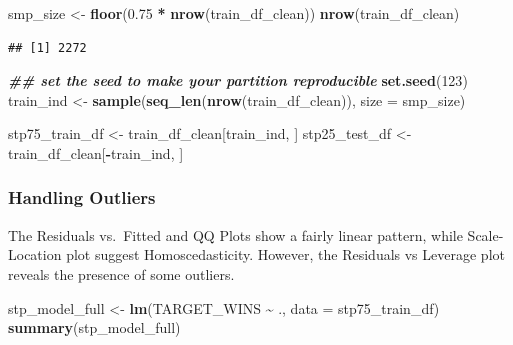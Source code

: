 \documentclass[
]{article}
\newenvironment{Shaded}{\begin{snugshade}}{\end{snugshade}}
\newcommand{\AttributeTok}[1]{\textcolor[rgb]{0.13,0.29,0.53}{#1}}
\newcommand{\DecValTok}[1]{\textcolor[rgb]{0.00,0.00,0.81}{#1}}
\newcommand{\DocumentationTok}[1]{\textcolor[rgb]{0.56,0.35,0.01}{\textbf{\textit{#1}}}}
\newcommand{\FloatTok}[1]{\textcolor[rgb]{0.00,0.00,0.81}{#1}}
\newcommand{\FunctionTok}[1]{\textcolor[rgb]{0.13,0.29,0.53}{\textbf{#1}}}
\newcommand{\NormalTok}[1]{#1}
\newcommand{\OtherTok}[1]{\textcolor[rgb]{0.56,0.35,0.01}{#1}}
\newcommand{\SpecialCharTok}[1]{\textcolor[rgb]{0.81,0.36,0.00}{\textbf{#1}}}
\begin{document}
\begin{Shaded}
\begin{Highlighting}[]
\NormalTok{smp\_size }\OtherTok{\textless{}{-}} \FunctionTok{floor}\NormalTok{(}\FloatTok{0.75} \SpecialCharTok{*} \FunctionTok{nrow}\NormalTok{(train\_df\_clean))}
 \FunctionTok{nrow}\NormalTok{(train\_df\_clean)}
\end{Highlighting}
\end{Shaded}

\begin{verbatim}
## [1] 2272
\end{verbatim}

\begin{Shaded}
\begin{Highlighting}[]
\DocumentationTok{\#\# set the seed to make your partition reproducible}
\FunctionTok{set.seed}\NormalTok{(}\DecValTok{123}\NormalTok{)}
\NormalTok{train\_ind }\OtherTok{\textless{}{-}} \FunctionTok{sample}\NormalTok{(}\FunctionTok{seq\_len}\NormalTok{(}\FunctionTok{nrow}\NormalTok{(train\_df\_clean)), }\AttributeTok{size =}\NormalTok{ smp\_size)}

\NormalTok{stp75\_train\_df }\OtherTok{\textless{}{-}}\NormalTok{ train\_df\_clean[train\_ind, ]}
\NormalTok{stp25\_test\_df }\OtherTok{\textless{}{-}}\NormalTok{ train\_df\_clean[}\SpecialCharTok{{-}}\NormalTok{train\_ind, ]}
\end{Highlighting}
\end{Shaded}

\subsubsection{Handling Outliers}\label{handling-outliers}

The Residuals vs.~Fitted and QQ Plots show a fairly linear pattern,
while Scale-Location plot suggest Homoscedasticity. However, the
Residuals vs Leverage plot reveals the presence of some outliers.

\begin{Shaded}
\begin{Highlighting}[]
\NormalTok{stp\_model\_full }\OtherTok{\textless{}{-}} \FunctionTok{lm}\NormalTok{(TARGET\_WINS }\SpecialCharTok{\textasciitilde{}}\NormalTok{ ., }\AttributeTok{data =}\NormalTok{ stp75\_train\_df)}
\FunctionTok{summary}\NormalTok{(stp\_model\_full)}
\end{Highlighting}
\end{Shaded}
\end{document}
